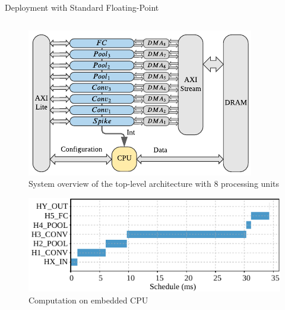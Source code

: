 \begin{frame}{Deployment with Standard Floating-Point}
	\begin{columns}
		\begin{column}{0.5\textwidth}
			\begin{minipage}[c][.45\textheight][c]{\linewidth}
				\centering
				\begin{figure}
				\includegraphics[width=0.75\linewidth]{../chapters/sbs_accelerator/figures/sbs_hw_experimental.pdf} %
				\caption{System overview of the top-level architecture with 8 processing units}
				\end{figure}
				\pause
			\end{minipage}
			
			\begin{minipage}[c][.45\textheight][c]{\linewidth}
				\centering
				\begin{figure}
				\includegraphics[width=0.75\linewidth]{../chapters/sbs_accelerator/figures/latency_sw.pdf} %
				\caption{Computation on embedded CPU}
				\end{figure}
				\pause
			\end{minipage}
		\end{column}
		

\end{columns}
\end{frame}
